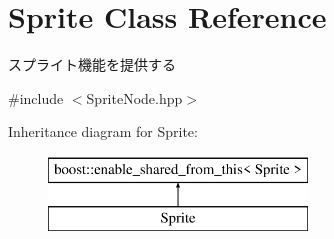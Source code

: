 \hypertarget{class_sprite}{}\section{Sprite Class Reference}
\label{class_sprite}


スプライト機能を提供する  




{\ttfamily \#include $<$Sprite\+Node.\+hpp$>$}

Inheritance diagram for Sprite\+:\begin{figure}[H]
\begin{center}
\leavevmode
\includegraphics[height=2.000000cm]{class_sprite}
\end{center}
\end{figure}
